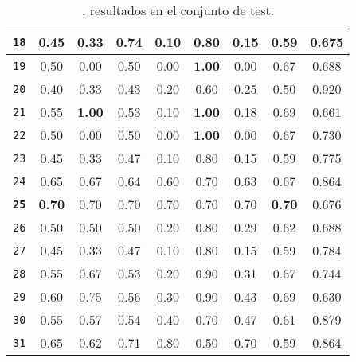 \begin{table}[h]
{\begin{tabular}{|c|c|cc|cc|cc|c|}
\lstinline!18! & 0.45 & \multicolumn{1}{c|}{0.33} & 0.74 & \multicolumn{1}{c|}{0.10} & 0.80 & \multicolumn{1}{c|}{0.15} & 0.59 & 0.675 \\ \hline
\lstinline!19! & 0.50 & \multicolumn{1}{c|}{0.00} & 0.50 & \multicolumn{1}{c|}{0.00} & \textbf{1.00} & \multicolumn{1}{c|}{0.00} & 0.67 & 0.688 \\ \hline
\lstinline!20! & 0.40 & \multicolumn{1}{c|}{0.33} & 0.43 & \multicolumn{1}{c|}{0.20} & 0.60 & \multicolumn{1}{c|}{0.25} & 0.50 & 0.920 \\ \hline
\lstinline!21! & 0.55 & \multicolumn{1}{c|}{\textbf{1.00}} & 0.53 & \multicolumn{1}{c|}{0.10} & \textbf{1.00} & \multicolumn{1}{c|}{0.18} & 0.69 & 0.661 \\ \hline
\lstinline!22! & 0.50 & \multicolumn{1}{c|}{0.00} & 0.50 & \multicolumn{1}{c|}{0.00} & \textbf{1.00} & \multicolumn{1}{c|}{0.00} & 0.67 & 0.730 \\ \hline
\lstinline!23! & 0.45 & \multicolumn{1}{c|}{0.33} & 0.47 & \multicolumn{1}{c|}{0.10} & 0.80 & \multicolumn{1}{c|}{0.15} & 0.59 & 0.775 \\ \hline
\lstinline!24! & 0.65 & \multicolumn{1}{c|}{0.67} & 0.64 & \multicolumn{1}{c|}{0.60} & 0.70 & \multicolumn{1}{c|}{0.63} & 0.67 & 0.864 \\ \hline
\rowcolor[HTML]{32CB00} 
\textbf{\lstinline!25!} & \textbf{0.70} & \multicolumn{1}{c|}{0.70} & 0.70 & \multicolumn{1}{c|}{0.70} & 0.70 & \multicolumn{1}{c|}{0.70} & \textbf{0.70} & 0.676 \\ \hline
\lstinline!26! & 0.50 & \multicolumn{1}{c|}{0.50} & 0.50 & \multicolumn{1}{c|}{0.20} & 0.80 & \multicolumn{1}{c|}{0.29} & 0.62 & 0.688 \\ \hline
\lstinline!27! & 0.45 & \multicolumn{1}{c|}{0.33} & 0.47 & \multicolumn{1}{c|}{0.10} & 0.80 & \multicolumn{1}{c|}{0.15} & 0.59 & 0.784 \\ \hline
\lstinline!28! & 0.55 & \multicolumn{1}{c|}{0.67} & 0.53 & \multicolumn{1}{c|}{0.20} & 0.90 & \multicolumn{1}{c|}{0.31} & 0.67 & 0.744 \\ \hline
\lstinline!29! & 0.60 & \multicolumn{1}{c|}{0.75} & 0.56 & \multicolumn{1}{c|}{0.30} & 0.90 & \multicolumn{1}{c|}{0.43} & 0.69 & 0.630 \\ \hline
\lstinline!30! & 0.55 & \multicolumn{1}{c|}{0.57} & 0.54 & \multicolumn{1}{c|}{0.40} & 0.70 & \multicolumn{1}{c|}{0.47} & 0.61 & 0.879 \\ \hline
\lstinline!31! & 0.65 & \multicolumn{1}{c|}{0.62} & 0.71 & \multicolumn{1}{c|}{0.80} & 0.50 & \multicolumn{1}{c|}{0.70} & 0.59 & 0.864 \\ \hline
\end{tabular}%
}
\caption[Nodule-98-30K-GS-*: Todos los resultados de test]{, resultados en el conjunto de test.}
\label{table:nodule-98-30K-_completeResults}
\end{table}
